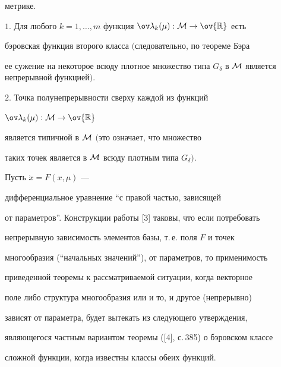 метрике. 


 


\begin{thm} 


$1$. Для любого $k=1,\dotsc,m$ функция $\ov\lambda_k(\mu):\cal 


M\to\ov{\Bbb R}$ есть 


бэровская функция второго класса $($следовательно, по теореме Бэра 


ее сужение на некоторое всюду плотное множество типа $G_\delta$ в $\cal 


M$ является непрерывной функцией$)$. 


 


$2$. Точка полунепрерывности сверху каждой из функций 


$\ov\lambda_k(\mu):\cal M\to\ov{\Bbb R}$ 


является типичной в $\cal M$ $($это означает, что множество 


таких точек является в $\cal M$ всюду плотным типа $G_\delta)$. 


\end{thm} 


 


Пусть $\Dot x=F(x,\mu)$ --- 


дифференциальное уравнение ``с правой частью, зависящей 


от параметров''. Конструкции работы [3] таковы, что если потребовать 


непрерывную зависимость элементов базы, т.\,е. поля $F$ и точек 


многообразия (``начальных значений''), от параметров, то применимость 


приведенной теоремы к рассматриваемой ситуации, когда векторное 


поле либо структура многообразия или и то, и другое (непрерывно) 


зависят от параметра, будет вытекать из следующего утверждения, 


являющегося частным вариантом теоремы ([4], с.\,385) о бэровском классе 


сложной функции, когда известны классы обеих функций. 


 


